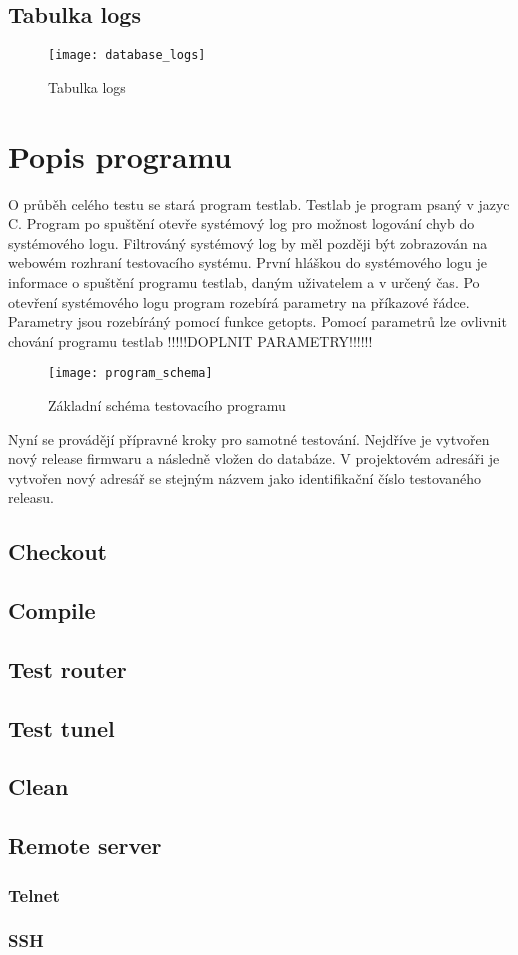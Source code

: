 \subsection{Tabulka logs}

\begin{figure}[h]
  \centering
  \texttt{[image: database\_logs]}
  \caption{Tabulka logs}
  \label{fig:database_logs}
\end{figure}

\section{Popis programu}

O průběh celého testu se stará program testlab. Testlab je program psaný v jazyc C. Program po spuštění otevře systémový log pro možnost logování chyb do systémového logu. Filtrováný systémový log by měl později být zobrazován na webowém rozhraní testovacího systému. První hláškou do systémového logu je informace o spuštění programu testlab, daným uživatelem a v určený čas. Po otevření systémového logu program rozebírá parametry na příkazové řádce. Parametry jsou rozebíráný pomocí funkce getopts. Pomocí parametrů lze ovlivnit chování programu testlab !!!!!DOPLNIT PARAMETRY!!!!!!

\begin{figure}[h]
  \centering
  \texttt{[image: program\_schema]}
  \caption{Základní schéma testovacího programu}
  \label{fig:program_schema}
\end{figure}


Nyní se provádějí přípravné kroky pro samotné testování. Nejdříve je vytvořen nový release firmwaru a následně vložen do databáze. V projektovém adresáři je vytvořen nový adresář se stejným názvem jako identifikační číslo testovaného releasu.

\subsection{Checkout}
\subsection{Compile}
\subsection{Test router}
\subsection{Test tunel}
\subsection{Clean}
\subsection{Remote server}
\subsubsection{Telnet}
\subsubsection{SSH}

\endinput
